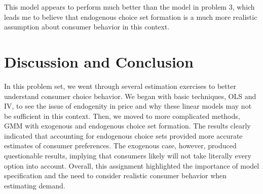 \documentclass{article}
\begin{document}
This model appears to perform much better than the model in problem 3, which leads me to believe that endogenous choice set formation is a much more realistic
assumption about consumer behavior in this context.

\section*{Discussion and Conclusion}

In this problem set, we went through several estimation exercises to better understand consumer choice behavior. We began with basic techniques, OLS and IV, to 
see the issue of endogenity in price and why these linear models may not be sufficient in this context. Then, we moved to more complicated methods, GMM with
exogenous and endogenous choice set formation. The results clearly indicated that accounting for endogenous choice sets provided more accurate estimates of 
consumer preferences. The exogenous case, however, produced questionable results, implying that consumers likely will not take literally every option into account.
Overall, this assignment highlighted the importance of model specification and the need to consider realistic consumer behavior when estimating demand.
\end{document}

